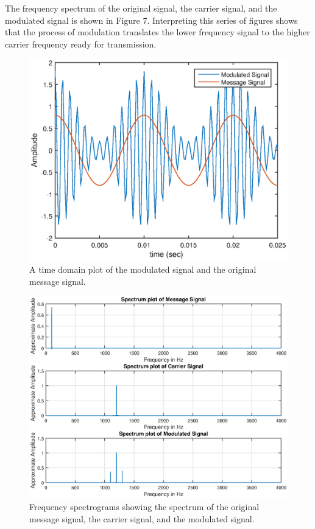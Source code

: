 \documentclass{article}
\begin{document}
The frequency spectrum of the original signal, the carrier signal, and the modulated signal is shown in Figure 7. Interpreting this series of figures shows that the process of modulation translates the lower frequency signal to the higher carrier frequency ready for transmission.

\begin{figure}[H]
	\centering
	\includegraphics[scale=0.7]{fig5.eps}
	\caption{A time domain plot of the modulated signal and the original message signal.}
\end{figure}
	
\begin{figure}[H]
	\centering
	\includegraphics[scale=0.7]{fig6.eps}
	\caption{Frequency spectrograms showing the spectrum of the original message signal, the carrier signal, and the modulated signal.}
\end{figure}
\end{document}
